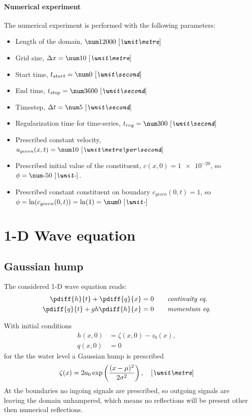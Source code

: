 \paragraph*{Numerical experiment}
The numerical experiment is performed with the following parameters:
\begin{itemize}
    \item Length of the domain, $\bqty{12000}{\metre}$
    \item Grid size, $\Dx = \bqty{10}{\metre}$
    \item Start time, $t_{start} = \bqty{0}{\second}$
    \item End time, $t_{stop} = \bqty{3600}{\second}$
    \item Timestep, $\Dt = \bqty{5}{\second}$
    \item Regularization time for time-series, $t_{reg} = \bqty{300}{\second}$
    \item Prescribed constant velocity, $u_{given}(x,t) = \bqty{10}{\metre\per\second}$
    \item Prescribed initial value of the constituent, $c(x,0)= \num{1e-20}$, \newline so $\phi = \bqty{-50}{-}$.
    \item Prescribed constant constituent on boundary $c_{given}(0,t) = 1$, \newline so $\phi = \ln(c_{given}(0,t)) = \ln(1) = \bqty{0}{-}$
\end{itemize}
\section{1-D Wave equation}\label{sec:numerical_experiment_gaussian_hump}
\subsection{Gaussian hump}
The considered 1-D wave equation reads:
\begin{align}
    \pdiff{h}{t}  + \pdiff{q}{x} & = 0 \qquad \textit{continuity eq.} \\
    \pdiff{q}{t}  + g h \pdiff{h}{x} & = 0 \qquad \textit{momentum eq.}
\end{align}

With initial conditions
\begin{align}
    h(x,0) & = \zeta(x,0) - z_b(x),\\
    q(x,0) & = 0
\end{align}
for the the water level a Gaussian hump is prescribed
\begin{align}
    \zeta(x) = 2 a_0 \exp\left( \frac{(x - \mu)^2}{2\sigma^2}  \right), \quad \bunit{\metre}
\end{align}
At the boundaries no ingoing signals are prescribed, so outgoing signals are leaving the domain unhampered, which means no reflections will be present other then numerical reflections.

